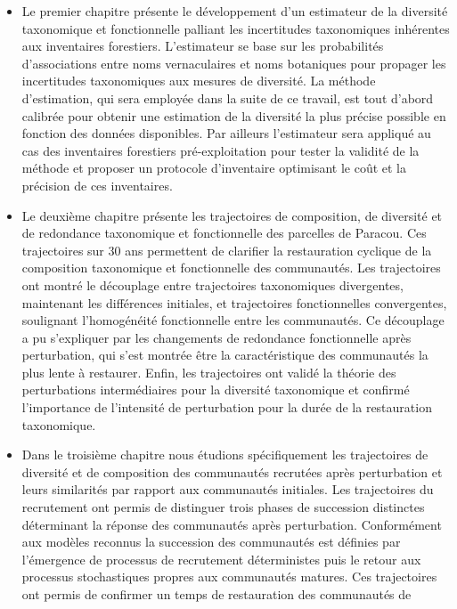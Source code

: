 \documentclass[
  11pt,
  french,
  A4paper,
  extrafontsizes,onecolumn,openright
  ]{memoir}
\begin{document}
\begin{itemize}
\item
  Le premier chapitre présente le développement d'un estimateur de la
  diversité taxonomique et fonctionnelle palliant les incertitudes
  taxonomiques inhérentes aux inventaires forestiers. L'estimateur se
  base sur les probabilités d'associations entre noms vernaculaires et
  noms botaniques pour propager les incertitudes taxonomiques aux
  mesures de diversité. La méthode d'estimation, qui sera employée dans
  la suite de ce travail, est tout d'abord calibrée pour obtenir une
  estimation de la diversité la plus précise possible en fonction des
  données disponibles. Par ailleurs l'estimateur sera appliqué au cas
  des inventaires forestiers pré-exploitation pour tester la validité de
  la méthode et proposer un protocole d'inventaire optimisant le coût et
  la précision de ces inventaires.
\item
  Le deuxième chapitre présente les trajectoires de composition, de
  diversité et de redondance taxonomique et fonctionnelle des parcelles
  de Paracou. Ces trajectoires sur 30 ans permettent de clarifier la
  restauration cyclique de la composition taxonomique et fonctionnelle
  des communautés. Les trajectoires ont montré le découplage entre
  trajectoires taxonomiques divergentes, maintenant les différences
  initiales, et trajectoires fonctionnelles convergentes, soulignant
  l'homogénéité fonctionnelle entre les communautés. Ce découplage a pu
  s'expliquer par les changements de redondance fonctionnelle après
  perturbation, qui s'est montrée être la caractéristique des
  communautés la plus lente à restaurer. Enfin, les trajectoires ont
  validé la théorie des perturbations intermédiaires pour la diversité
  taxonomique et confirmé l'importance de l'intensité de perturbation
  pour la durée de la restauration taxonomique.
\item
  Dans le troisième chapitre nous étudions spécifiquement les
  trajectoires de diversité et de composition des communautés recrutées
  après perturbation et leurs similarités par rapport aux communautés
  initiales. Les trajectoires du recrutement ont permis de distinguer
  trois phases de succession distinctes déterminant la réponse des
  communautés après perturbation. Conformément aux modèles reconnus la
  succession des communautés est définies par l'émergence de processus
  de recrutement déterministes puis le retour aux processus
  stochastiques propres aux communautés matures. Ces trajectoires ont
  permis de confirmer un temps de restauration des communautés de

\end{itemize}
\end{document}
